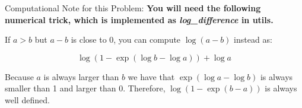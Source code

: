 \documentclass[submit]{harvardml}
\theoremstyle{plain}
\begin{document}
\vspace{0.5cm }
\noindent
Computational Note for this Problem: \textbf{You will need the following numerical trick,
which is implemented as \textit{log\_difference} in utils.}

If $a > b $ but $a-b$ is close to 0, you can compute $\log(a-b)$
instead as:

\[\log(1 - \exp(\log b - \log a))+\log a \]

\noindent Because $a$ is always larger than $b$ we have that $\exp(\log a- \log b )$
is always smaller than 1 and larger than 0. Therefore,
$\log(1 - \exp(b - a))$ is always well defined.




\end{document}
